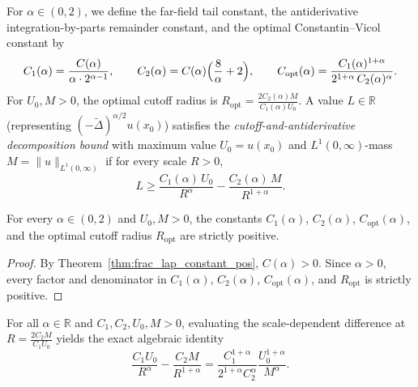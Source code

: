 \begin{definition}\label{def:nlmp_constants}
\leanok
For $\alpha \in (0, 2)$, we define the far-field tail constant, the antiderivative integration-by-parts remainder constant, and the optimal Constantin--Vicol constant by
\[
  C_1(\alpha) = \frac{C(\alpha)}{\alpha \cdot 2^{\alpha - 1}}, \qquad
  C_2(\alpha) = C(\alpha)\Bigl(\frac{8}{\alpha} + 2\Bigr), \qquad
  C_{\mathrm{opt}}(\alpha) = \frac{C_1(\alpha)^{1 + \alpha}}{2^{1 + \alpha}\, C_2(\alpha)^\alpha}.
\]
For $U_0, M > 0$, the optimal cutoff radius is $R_{\mathrm{opt}} = \frac{2 C_2(\alpha) M}{C_1(\alpha) U_0}$. A value $L \in \mathbb{R}$ (representing $(-\widetilde{\Delta})^{\alpha/2} u(x_0)$) satisfies the \emph{cutoff-and-antiderivative decomposition bound} with maximum value $U_0 = u(x_0)$ and $L^1(0, \infty)$-mass $M = \lVert u \rVert_{L^1(0, \infty)}$ if for every scale $R > 0$,
\[
  L \ge \frac{C_1(\alpha)\, U_0}{R^\alpha} - \frac{C_2(\alpha)\, M}{R^{1 + \alpha}}.
\]
\end{definition}

\begin{lemma}\label{lem:nlmp_constants_pos}
\leanok
For every $\alpha \in (0, 2)$ and $U_0, M > 0$, the constants $C_1(\alpha)$, $C_2(\alpha)$, $C_{\mathrm{opt}}(\alpha)$, and the optimal cutoff radius $R_{\mathrm{opt}}$ are strictly positive.
\end{lemma}

\begin{proof}
\leanok
By Theorem~\ref{thm:frac_lap_constant_pos}, $C(\alpha) > 0$. Since $\alpha > 0$, every factor and denominator in $C_1(\alpha)$, $C_2(\alpha)$, $C_{\mathrm{opt}}(\alpha)$, and $R_{\mathrm{opt}}$ is strictly positive.
\end{proof}

\begin{lemma}\label{lem:nlmp_scale_optimization}
\leanok
For all $\alpha \in \mathbb{R}$ and $C_1, C_2, U_0, M > 0$, evaluating the scale-dependent difference at $R = \frac{2 C_2 M}{C_1 U_0}$ yields the exact algebraic identity
\[
  \frac{C_1 U_0}{R^\alpha} - \frac{C_2 M}{R^{1 + \alpha}} = \frac{C_1^{1 + \alpha}}{2^{1 + \alpha} C_2^\alpha} \frac{U_0^{1 + \alpha}}{M^\alpha}.
\]
\end{lemma}

